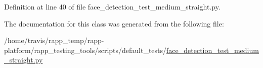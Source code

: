 Definition at line 40 of file face\-\_\-detection\-\_\-test\-\_\-medium\-\_\-straight.\-py.



The documentation for this class was generated from the following file\-:\begin{DoxyCompactItemize}
\item 
/home/travis/rapp\-\_\-temp/rapp-\/platform/rapp\-\_\-testing\-\_\-tools/scripts/default\-\_\-tests/\hyperlink{face__detection__test__medium__straight_8py}{face\-\_\-detection\-\_\-test\-\_\-medium\-\_\-straight.\-py}\end{DoxyCompactItemize}
